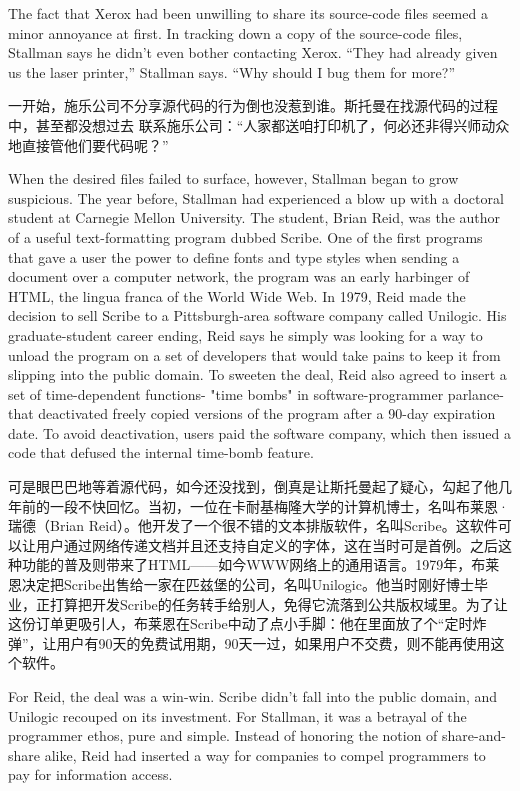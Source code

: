\ifdefined\eng
The fact that Xerox had been unwilling to share its source-code files seemed a
minor annoyance at first. In tracking down a copy of the source-code files,
Stallman says he didn't even bother contacting Xerox. ``They had already given
us the laser printer,'' Stallman says. ``Why should I bug them for more?''
\fi

\ifdefined\chs
一开始，施乐公司不分享源代码的行为倒也没惹到谁。斯托曼在找源代码的过程中，甚至都没想过去
联系施乐公司：``人家都送咱打印机了，何必还非得兴师动众地直接管他们要代码呢？''
\fi

\ifdefined\eng
When the desired files failed to surface, however, Stallman began to grow suspicious. The year before, Stallman had experienced a blow up with a doctoral student at Carnegie Mellon University. The student, Brian Reid, was the author of a useful text-formatting program dubbed Scribe. One of the first programs that gave a user the power to define fonts and type styles when sending a document over a computer network, the program was an early harbinger of HTML, the lingua franca of the World Wide Web. In 1979, Reid made the decision to sell Scribe to a Pittsburgh-area software company called Unilogic. His graduate-student career ending, Reid says he simply was looking for a way to unload the program on a set of developers that would take pains to keep it from slipping into the public domain. To sweeten the deal, Reid also agreed to insert a set of time-dependent functions- "time bombs" in software-programmer parlance-that deactivated freely copied versions of the program after a 90-day expiration date. To avoid deactivation, users paid the software company, which then issued a code that defused the internal time-bomb feature.
\fi

\ifdefined\chs
可是眼巴巴地等着源代码，如今还没找到，倒真是让斯托曼起了疑心，勾起了他几年前的一段不快回忆。当初，一位在卡耐基梅隆大学的计算机博士，名叫布莱恩·瑞德（Brian Reid）。他开发了一个很不错的文本排版软件，名叫Scribe。这软件可以让用户通过网络传递文档并且还支持自定义的字体，这在当时可是首例。之后这种功能的普及则带来了HTML——如今WWW网络上的通用语言。1979年，布莱恩决定把Scribe出售给一家在匹兹堡的公司，名叫Unilogic。他当时刚好博士毕业，正打算把开发Scribe的任务转手给别人，免得它流落到公共版权域里。为了让这份订单更吸引人，布莱恩在Scribe中动了点小手脚：他在里面放了个“定时炸弹”，让用户有90天的免费试用期，90天一过，如果用户不交费，则不能再使用这个软件。
\fi

\ifdefined\eng
For Reid, the deal was a win-win. Scribe didn't fall into the public domain, and Unilogic recouped on its investment. For Stallman, it was a betrayal of the programmer ethos, pure and simple. Instead of honoring the notion of share-and-share alike, Reid had inserted a way for companies to compel programmers to pay for information access.
\fi

